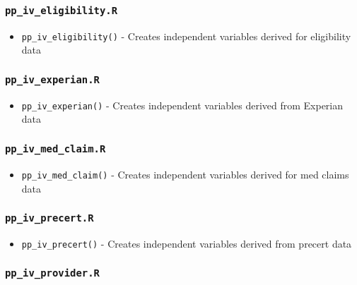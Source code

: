 \documentclass[
]{book}
\providecommand{\tightlist}{%
  \setlength{\itemsep}{0pt}\setlength{\parskip}{0pt}}
\begin{document}
\hypertarget{pp_iv_eligibility.r}{%
\subsubsection{\texorpdfstring{\texttt{pp\_iv\_eligibility.R}}{pp\_iv\_eligibility.R}}\label{pp_iv_eligibility.r}}

\begin{itemize}
\tightlist
\item
  \texttt{pp\_iv\_eligibility()} - Creates independent variables derived for eligibility data
\end{itemize}

\hypertarget{pp_iv_experian.r}{%
\subsubsection{\texorpdfstring{\texttt{pp\_iv\_experian.R}}{pp\_iv\_experian.R}}\label{pp_iv_experian.r}}

\begin{itemize}
\tightlist
\item
  \texttt{pp\_iv\_experian()} - Creates independent variables derived from Experian data
\end{itemize}

\hypertarget{pp_iv_med_claim.r}{%
\subsubsection{\texorpdfstring{\texttt{pp\_iv\_med\_claim.R}}{pp\_iv\_med\_claim.R}}\label{pp_iv_med_claim.r}}

\begin{itemize}
\tightlist
\item
  \texttt{pp\_iv\_med\_claim()} - Creates independent variables derived for med claims data
\end{itemize}

\hypertarget{pp_iv_precert.r}{%
\subsubsection{\texorpdfstring{\texttt{pp\_iv\_precert.R}}{pp\_iv\_precert.R}}\label{pp_iv_precert.r}}

\begin{itemize}
\tightlist
\item
  \texttt{pp\_iv\_precert()} - Creates independent variables derived from precert data
\end{itemize}

\hypertarget{pp_iv_provider.r}{%
\subsubsection{\texorpdfstring{\texttt{pp\_iv\_provider.R}}{pp\_iv\_provider.R}}\label{pp_iv_provider.r}}
\end{document}
